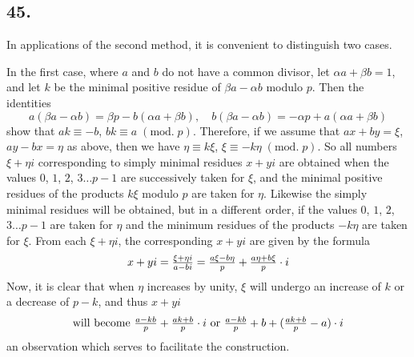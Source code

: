\documentclass[twoside,12pt]{memoir}
\renewcommand{\pmod}[1]{\;(\textrm{mod.}\;#1)}
\let\oldfrac\frac
\def\frac#1#2{\mathchoice{\tfrac{#1}{#2}}{\oldfrac{#1}{#2}}{\genfrac{}{}{}{2}{#1}{#2\mathstrut}}{\genfrac{}{}{}{3}{#1}{#2\mathstrut}}}
\begin{document}
\subsection*{45.}

In applications of the second method, it is convenient to distinguish two cases.

In the first case, where \(a\) and \(b\) do not have a common divisor, let \(\alpha a+\beta b=1\), and let \(k\) be the minimal positive residue of \(\beta a-\alpha b\) modulo \(p\). Then the identities
\[a(\beta a-\alpha b)=\beta p-b(\alpha a+\beta b), \quad b(\beta a-\alpha b)=-\alpha p+a(\alpha a+\beta b)\]
show that \(a k \equiv-b\), \(b k \equiv a \pmod{p}\). Therefore, if we assume that \(a x+b y=\xi\), \pagebreak%
\(a y-b x=\eta\) as above, then we have \(\eta \equiv k \xi\), \(\xi \equiv -k \eta \pmod{p}\). So all numbers \(\xi+\eta i\) corresponding to simply minimal residues \(x+y i\) are obtained when the values \(0\), \(1\), \(2\), \(3 \ldots p-1\) are successively taken for \(\xi\), and the minimal positive residues of the products \(k \xi\) modulo \(p\) are taken for \(\eta\).  Likewise the simply minimal residues will be obtained, but in a different order, if the values \(0\), \(1\), \(2\), \(3 \ldots p-1\) are taken for \(\eta\) and the minimum residues of the products \(-k \eta\) are taken for \(\xi\). From each \(\xi+\eta i\), the corresponding \(x+y i\) are given by the formula
\[x+y i=\frac{\xi+\eta i}{a-b i}=\frac{a \xi-b \eta}{p}+\frac{a \eta+b \xi}{p} \cdot i\]
Now, it is clear that when \(\eta\) increases by unity, \(\xi\) will undergo an increase of \(k\) or a decrease of \(p-k\), and thus \(x+y i\)
\[ \text{will become } \frac{a-k b}{p}+\frac{a k+b}{p} \cdot i \text{ or } \frac{a-k b}{p}+b+(\frac{a k+b}{p}-a) \cdot i \]
an observation which serves to facilitate the construction.
\end{document}
